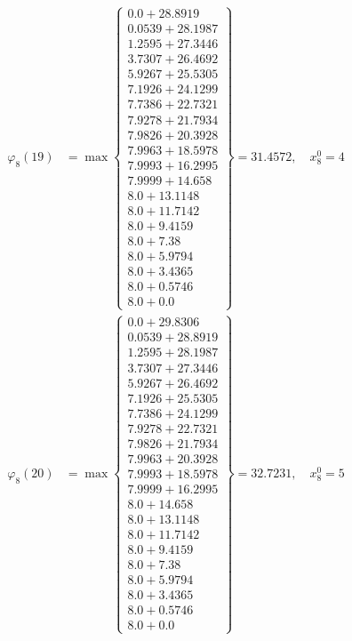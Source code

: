 \documentclass{article}
\begin{document}
\begin{align*}
  
  
  
\varphi_{8}(19) &= \max \left\{ \begin{array}{c}
0.0 + 28.8919 \\
 0.0539 + 28.1987 \\
 1.2595 + 27.3446 \\
 3.7307 + 26.4692 \\
 5.9267 + 25.5305 \\
 7.1926 + 24.1299 \\
 7.7386 + 22.7321 \\
 7.9278 + 21.7934 \\
 7.9826 + 20.3928 \\
 7.9963 + 18.5978 \\
 7.9993 + 16.2995 \\
 7.9999 + 14.658 \\
 8.0 + 13.1148 \\
 8.0 + 11.7142 \\
 8.0 + 9.4159 \\
 8.0 + 7.38 \\
 8.0 + 5.9794 \\
 8.0 + 3.4365 \\
 8.0 + 0.5746 \\
 8.0 + 0.0
\end{array} \right\}=31.4572,\quad x_{8}^0=4\\
  
  
  
  
\varphi_{8}(20) &= \max \left\{ \begin{array}{c}
0.0 + 29.8306 \\
 0.0539 + 28.8919 \\
 1.2595 + 28.1987 \\
 3.7307 + 27.3446 \\
 5.9267 + 26.4692 \\
 7.1926 + 25.5305 \\
 7.7386 + 24.1299 \\
 7.9278 + 22.7321 \\
 7.9826 + 21.7934 \\
 7.9963 + 20.3928 \\
 7.9993 + 18.5978 \\
 7.9999 + 16.2995 \\
 8.0 + 14.658 \\
 8.0 + 13.1148 \\
 8.0 + 11.7142 \\
 8.0 + 9.4159 \\
 8.0 + 7.38 \\
 8.0 + 5.9794 \\
 8.0 + 3.4365 \\
 8.0 + 0.5746 \\
 8.0 + 0.0
\end{array} \right\}=32.7231,\quad x_{8}^0=5\\
  

\end{align*}
\end{document}
